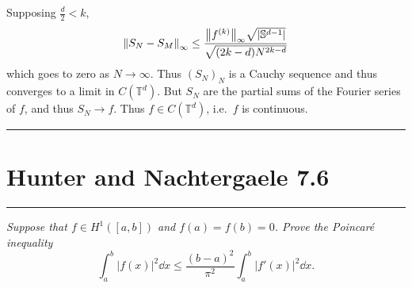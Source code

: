 \documentclass[fontsize=11pt]{article} %
\theoremstyle{plain}
\numberwithin{equation}{section} %
\numberwithin{figure}{section} %
\numberwithin{table}{section} %
\begin{document}
Supposing $\frac{d}{2} < k$,
\begin{align*}
    \norm{S_N - S_M}_\infty \leq \frac{\norm{f^{(k)}}_\infty\sqrt{|\mathbb{S}^{d-1}|}}{\sqrt{(2k-d)N^{2k-d}}}
\end{align*}
which goes to zero as $N \rightarrow \infty$.  Thus $(S_N)_N$ is a Cauchy sequence and thus converges to a limit in $C(\mathbb{T}^d)$.  But $S_N$ are the partial sums of the Fourier series of $f$, and thus $S_N \rightarrow f$.  Thus $f \in C(\mathbb{T}^d)$, i.e.~$f$ is continuous.

\begin{center}
    \noindent\rule{5cm}{1pt}
\end{center}
\section{\bf Hunter and Nachtergaele 7.6}
\begin{center}
    \noindent\rule{5cm}{1pt}
\end{center}

\emph{Suppose that $f \in H^1([a,b])$ and $f(a) = f(b) = 0$.  Prove the \emph{Poincar\'{e} inequality} $$\int_a^b|f(x)|^2 \dd x \leq \frac{(b-a)^2}{\pi^2}\int_a^b|f'(x)|^2 \dd x.$$}
\end{document}
